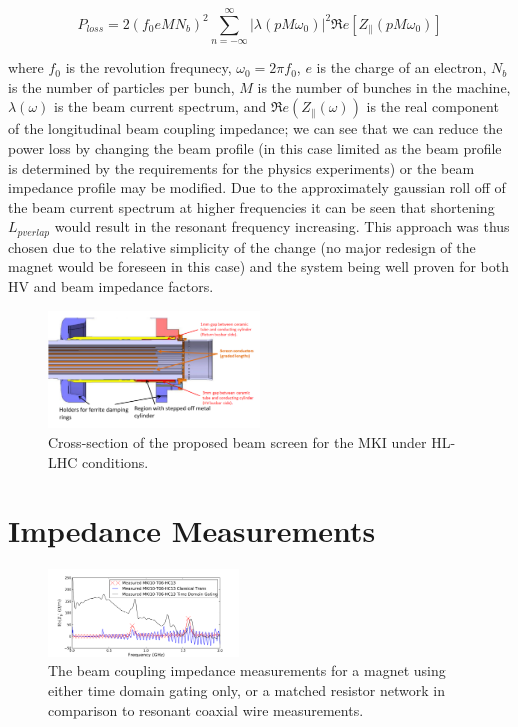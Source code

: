 \documentclass[a4paper,
              ]{jacow}
\begin{document}
\begin{equation}
P_{loss} = 2 \left( f_{0} e M  N_{b}\right)^{2} \displaystyle\sum\limits_{n = -\infty}^{\infty}  \left| \lambda \left( p M \omega_{0} \right)  \right|^{2} \Re{}e \left[ Z_{\parallel} \left( p M \omega_{0} \right) \right]
\label{eqn:powLoss}
\end{equation}

where $f_{0}$ is the revolution frequnecy, $\omega_{0} = 2\pi f_{0}$, $e$ is the charge of an electron, $N_{b}$ is the number of particles per bunch, $M$ is the number of bunches in the machine, $\lambda (\omega)$ is the beam current spectrum, and $\Re{}e(Z_{\parallel}(\omega))$ is the real component of the longitudinal beam coupling impedance; we can see that we can reduce the power loss by changing the beam profile (in this case limited as the beam profile is determined by the requirements for the physics experiments) or the beam impedance profile may be modified. Due to the approximately gaussian roll off of the beam current spectrum at higher frequencies it can be seen that shortening $L_{pverlap}$ would result in the resonant frequency increasing. This approach was thus chosen due to the relative simplicity of the change (no major redesign of the magnet would be foreseen in this case) and the system being well proven for both HV and beam impedance factors.


\begin{figure}
\begin{center}
\includegraphics[width=0.5\textwidth]{beamScreenCrossSectionLabelled.pdf}
\caption{Cross-section of the proposed beam screen for the MKI under HL-LHC conditions.}
\label{fig:BeamScreenHLLHC}
\end{center}
\end{figure}


\section{Impedance Measurements}



\begin{figure}
\includegraphics[width=0.45\textwidth]{compMeasurementGating.pdf}
\caption{The beam coupling impedance measurements for a magnet using either time domain gating only, or a matched resistor network in comparison to resonant coaxial wire measurements.}
\label{fig:measComp}
\end{figure}
\end{document}
